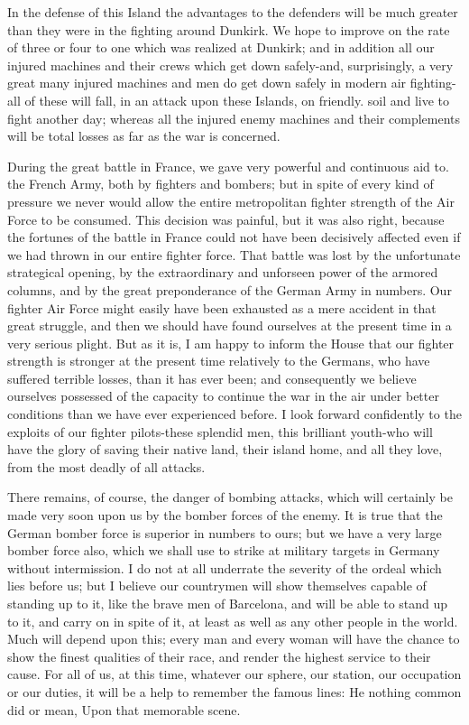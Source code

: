\documentclass[a4paper]{amsbook}
\begin{document}
In the defense of this Island the advantages to the defenders will be much greater than they were in the fighting around Dunkirk. We hope to improve on the rate of three or four to one which was realized at Dunkirk; and in addition all our injured machines and their crews which get down safely-and, surprisingly, a very great many injured machines and men do get down safely in modern air fighting-all of these will fall, in an attack upon these Islands, on friendly. soil and live to fight another day; whereas all the injured enemy machines and their complements will be total losses as far as the war is concerned.

During the great battle in France, we gave very powerful and continuous aid to. the French Army, both by fighters and bombers; but in spite of every kind of pressure we never would allow the entire metropolitan fighter strength of the Air Force to be consumed. This decision was painful, but it was also right, because the fortunes of the battle in France could not have been decisively affected even if we had thrown in our entire fighter force. That battle was lost by the unfortunate strategical opening, by the extraordinary and unforseen power of the armored columns, and by the great preponderance of the German Army in numbers. Our fighter Air Force might easily have been exhausted as a mere accident in that great struggle, and then we should have found ourselves at the present time in a very serious plight. But as it is, I am happy to inform the House that our fighter strength is stronger at the present time relatively to the Germans, who have suffered terrible losses, than it has ever been; and consequently we believe ourselves possessed of the capacity to continue the war in the air under better conditions than we have ever experienced before. I look forward confidently to the exploits of our fighter pilots-these splendid men, this brilliant youth-who will have the glory of saving their native land, their island home, and all they love, from the most deadly of all attacks.

There remains, of course, the danger of bombing attacks, which will certainly be made very soon upon us by the bomber forces of the enemy. It is true that the German bomber force is superior in numbers to ours; but we have a very large bomber force also, which we shall use to strike at military targets in Germany without intermission. I do not at all underrate the severity of the ordeal which lies before us; but I believe our countrymen will show themselves capable of standing up to it, like the brave men of Barcelona, and will be able to stand up to it, and carry on in spite of it, at least as well as any other people in the world. Much will depend upon this; every man and every woman will have the chance to show the finest qualities of their race, and render the highest service to their cause. For all of us, at this time, whatever our sphere, our station, our occupation or our duties, it will be a help to remember the famous lines: He nothing common did or mean, Upon that memorable scene.
\end{document}
